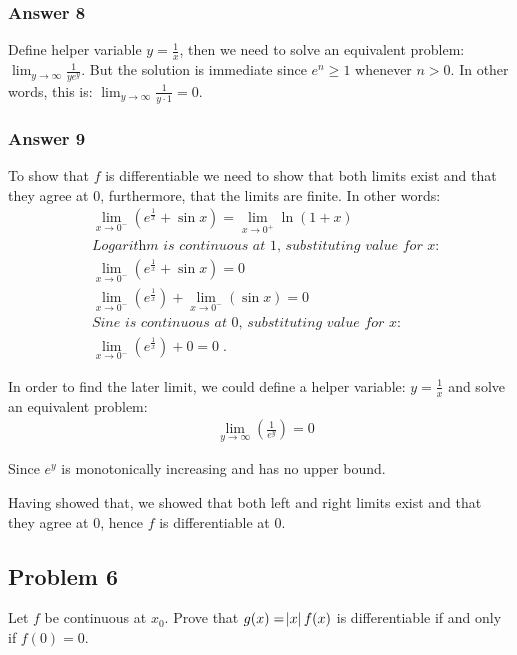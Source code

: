 \documentclass[a4paper]{article}
\begin{document}
\subsubsection{Answer 8}
\label{sec:orgheadline12}
Define helper variable \(y = \frac{1}{x}\), then we need to solve an equivalent
problem: \(\lim_{y \to \infty}\frac{1}{ye^{y}}\).  But the solution is immediate
since \(e^n \geq 1\) whenever \(n > 0\).  In other words, this is:
\(\lim_{y \to \infty}\frac{1}{y \cdot 1} = 0\).

\subsubsection{Answer 9}
\label{sec:orgheadline13}
To show that \(f\) is differentiable we need to show that both limits exist and
that they agree at 0, furthermore, that the limits are finite.  In other words:
\begin{align*}
  &\lim_{x \to 0^-}\left(e^{\frac{1}{x}} + \sin x\right) = \lim_{x \to 0^+}\ln(1 + x) \\
  &\textit{Logarithm is continuous at 1, substituting value for x:} \\
  &\lim_{x \to 0^-}\left(e^{\frac{1}{x}} + \sin x\right) = 0 \\
  &\lim_{x \to 0^-}\left(e^{\frac{1}{x}}\right) + \lim_{x \to 0^-}\left(\sin x\right) = 0 \\
  &\textit{Sine is continuous at 0, substituting value for x:} \\
  &\lim_{x \to 0^-}\left(e^{\frac{1}{x}}\right) + 0 = 0\;.
\end{align*}

In order to find the later limit, we could define a helper variable: \(y = \frac{1}{x}\)
and solve an equivalent problem:
\begin{align*}
  &\lim_{y \to \infty}\left(\frac{1}{e^y}\right) = 0
\end{align*}

Since \(e^y\) is monotonically increasing and has no upper bound.

Having showed that, we showed that both left and right limits exist and that they
agree at 0, hence \(f\) is differentiable at 0.

\subsection{Problem 6}
\label{sec:orgheadline16}
Let \(f\) be continuous at \(x_0\).  Prove that \(g(x) = \abs{x}f(x)\) is
differentiable if and only if \(f(0) = 0\).
\end{document}
